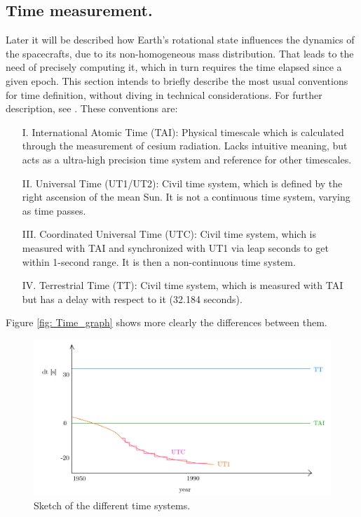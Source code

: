 	\subsection{Time measurement.}
	\indent Later it will be described how Earth's rotational state influences the dynamics of the spacecrafts, due to its non-homogeneous mass distribution. That leads to the need of precisely computing it, which in turn requires the time elapsed since a given epoch. This section intends to briefly describe the most usual conventions for time definition, without diving in technical considerations. For further description, see \cite{Time_handbook}. These conventions are:%
	\begin{itemize}
	\item[I.] International Atomic Time (TAI): Physical timescale which is calculated through the measurement of cesium radiation. Lacks intuitive meaning, but acts as a ultra-high precision time system and reference for other timescales.
	\item[II.] Universal Time (UT1/UT2): Civil time system, which is defined by the right ascension of the mean Sun. It is not a continuous time system, varying as time passes.  
	\item[III.] Coordinated Universal Time (UTC): Civil time system, which is measured with TAI and synchronized with UT1 via leap seconds to get within 1-second range. It is then a non-continuous time system.
	\item[IV.] Terrestrial Time (TT): Civil time system, which is measured with TAI but has a delay with respect to it (32.184 seconds).
	\end{itemize}
	\indent Figure \ref{fig:	Time_graph} shows more clearly the differences between them.
	\begin{figure}[!htb]
	\centering\includegraphics[width = 0.6\linewidth]{Appendices/Appendix_B/Time_graph}
	\caption{Sketch of the different time systems.}
	\label{fig:	Time_graph}
	\end{figure}
	\FloatBarrier
% 
